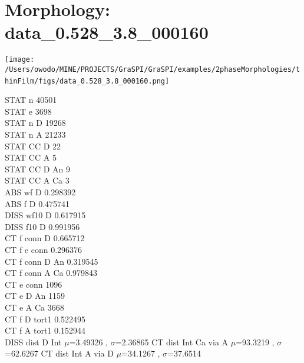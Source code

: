 \documentclass{article}
\begin{document}
\section{Morphology: data\_0.528\_3.8\_000160 }
\parbox{0.35\textwidth}{
\texttt{[image: /Users/owodo/MINE/PROJECTS/GraSPI/GraSPI/examples/2phaseMorphologies/thinFilm/figs/data\_0.528\_3.8\_000160.png]} \  
 ~\newline ~\newline 
\begin{small}
STAT n 40501\\
STAT e 3698\\
STAT n D 19268\\
STAT n A 21233\\
STAT CC D 22\\
STAT CC A 5\\
STAT CC D An 9\\
STAT CC A Ca 3\\
ABS wf D 0.298392\\
ABS f D 0.475741\\
DISS wf10 D 0.617915\\
DISS f10 D 0.991956\\
CT f conn D 0.665712\\
CT f e conn 0.296376\\
CT f conn D An 0.319545\\
CT f conn A Ca 0.979843\\
CT e conn 1096\\
CT e D An 1159\\
CT e A Ca 3668\\
CT f D tort1 0.522495\\
CT f A tort1 0.152944\\

DISS dist D Int $\mu$=3.49326 , $\sigma$=2.36865 \newline
CT dist Int Ca via A $\mu$=93.3219 , $\sigma$=62.6267 \newline
CT dist Int A via D $\mu$=34.1267 , $\sigma$=37.6514 \newline
\end{small}
}
\end{document}
